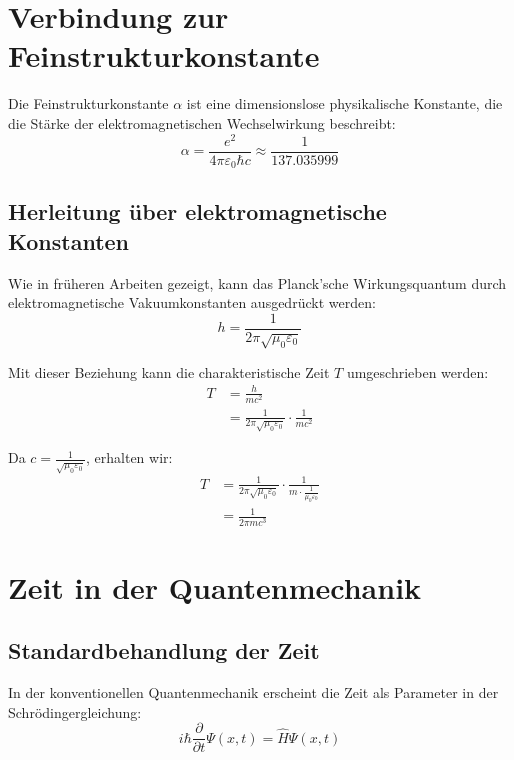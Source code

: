 \documentclass{article}
\begin{document}
	\section{Verbindung zur Feinstrukturkonstante}
	
	Die Feinstrukturkonstante $\alpha$ ist eine dimensionslose physikalische Konstante, die die Stärke der elektromagnetischen Wechselwirkung beschreibt:
	\begin{equation}
		\alpha = \frac{e^2}{4\pi\varepsilon_0\hbar c} \approx \frac{1}{137.035999}
	\end{equation}
	
	\subsection{Herleitung über elektromagnetische Konstanten}
	
	Wie in früheren Arbeiten gezeigt, kann das Planck’sche Wirkungsquantum durch elektromagnetische Vakuumkonstanten ausgedrückt werden:
	\begin{equation}
		h = \frac{1}{2\pi\sqrt{\mu_0\varepsilon_0}}
	\end{equation}
	
	Mit dieser Beziehung kann die charakteristische Zeit $T$ umgeschrieben werden:
	\begin{align}
		T &= \frac{h}{mc^2} \\
		&= \frac{1}{2\pi\sqrt{\mu_0\varepsilon_0}} \cdot \frac{1}{mc^2}
	\end{align}
	
	Da $c = \frac{1}{\sqrt{\mu_0\varepsilon_0}}$, erhalten wir:
	\begin{align}
		T &= \frac{1}{2\pi\sqrt{\mu_0\varepsilon_0}} \cdot \frac{1}{m \cdot \frac{1}{\mu_0\varepsilon_0}} \\
		&= \frac{1}{2\pi m c^3}
	\end{align}
	
	\section{Zeit in der Quantenmechanik}
	
	\subsection{Standardbehandlung der Zeit}
	
	In der konventionellen Quantenmechanik erscheint die Zeit als Parameter in der Schrödingergleichung:
	\begin{equation}
		i\hbar \frac{\partial}{\partial t}\Psi(x,t) = \hat{H}\Psi(x,t)
	\end{equation}
	
\end{document}
